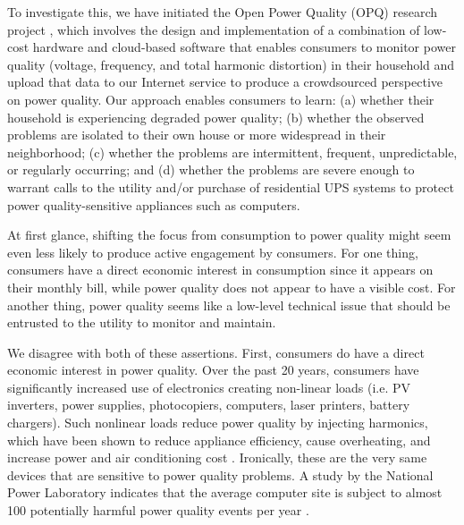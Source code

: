 \documentclass[11pt]{article}
\begin{document}
To investigate this, we have initiated the Open Power Quality (OPQ) research project \cite{opq-site}, which involves the design and implementation of a combination of low-cost hardware and cloud-based software that enables consumers to monitor power quality (voltage, frequency, and total harmonic distortion) in their household and upload that data to our Internet service to produce a crowdsourced perspective on power quality.  Our approach enables consumers to learn: (a) whether their household is experiencing degraded power quality; (b) whether the observed problems are isolated to their own house or more widespread in their neighborhood;  (c) whether the problems are intermittent, frequent, unpredictable, or regularly occurring;  and (d) whether the problems are severe enough to warrant calls to the utility and/or purchase of residential UPS systems to protect power quality-sensitive appliances such as computers. 


At first glance, shifting the focus from consumption to power quality might seem even less likely to produce active engagement by consumers. For one thing, consumers have a direct economic interest in consumption since it appears on their monthly bill, while power quality does not appear to have a visible cost.  For another thing, power quality seems like a low-level technical issue that should be entrusted to the utility to monitor and maintain. 

We disagree with both of these assertions. First, consumers do have a direct economic interest in power quality. Over the past 20 years, consumers have significantly increased use of electronics creating non-linear loads (i.e. PV inverters, power supplies, photocopiers, computers, laser printers, battery chargers). Such nonlinear loads reduce power quality by injecting harmonics, which have been shown to reduce appliance efficiency, cause overheating, and increase power and air conditioning cost \cite{Rodriguez2010}. Ironically, these are the very same devices that are sensitive to power quality problems. A study by the National Power Laboratory indicates that the average computer site is subject to almost 100 potentially harmful power quality events per year \cite{Dorr1992}.
\end{document}
